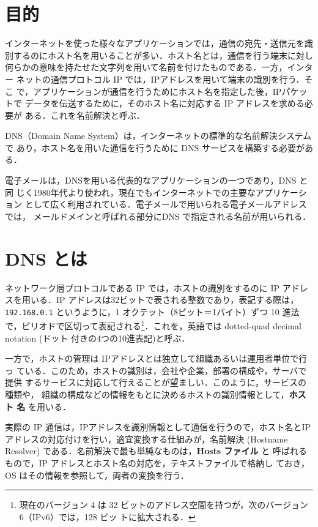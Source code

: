 \section{目的}

インターネットを使った様々なアプリケーションでは，通信の宛先・送信元を識
別するのにホスト名を用いることが多い．ホスト名とは，通信を行う端末に対し
何らかの意味を持たせた文字列を用いて名前を付けたものである．一方，インター
ネットの通信プロトコル IP では，IPアドレスを用いて端末の識別を行う．そこ
で，アプリケーションが通信を行うためにホスト名を指定した後，IPパケットで
データを伝送するために，そのホスト名に対応する IP アドレスを求める必要が
ある．これを名前解決と呼ぶ．

DNS（Domain Name System）は，インターネットの標準的な名前解決システムで
あり，ホスト名を用いた通信を行うために DNS サービスを構築する必要がある．

電子メールは，DNSを用いる代表的なアプリケーションの一つであり，DNS と同
じく1980年代より使われ，現在でもインターネットでの主要なアプリケーション
として広く利用されている．電子メールで用いられる電子メールアドレスでは，
メールドメインと呼ばれる部分にDNS で指定される名前が用いられる．

\section{DNS とは}
ネットワーク層プロトコルである IP では，ホストの識別をするのに IP アドレ
スを用いる．IP アドレスは32ビットで表される整数であり，表記する際は，
\texttt{192.168.0.1} というように，1 オクテット（8ビット＝1バイト）ずつ 
10 進法で，ピリオドで区切って表記される\footnote{現在のバージョン 4 は 
32 ビットのアドレス空間を持つが，次のバージョン 6（IPv6）では，128 ビッ
トに拡大される．}．これを，英語では dotted-quad decimal notation (ドット
付きの4つの10進表記)と呼ぶ．

一方で，ホストの管理は IPアドレスとは独立して組織あるいは運用者単位で行っ
ている．このため，ホストの識別は，会社や企業，部署の構成や，サーバで提供
するサービスに対応して行えることが望ましい．このように，サービスの種類や，
組織の構成などの情報をもとに決めるホストの識別情報として，\textbf{ホスト
名} を用いる．

実際の IP 通信は，IPアドレスを識別情報として通信を行うので，ホスト名とIP 
アドレスの対応付けを行い，適宜変換する仕組みが，名前解決 (Hostname
Resolver) である．名前解決で最も単純なものは，\textbf{Hosts ファイル} と
呼ばれるもので，IP アドレスとホスト名の対応を，テキストファイルで格納し
ておき，OS はその情報を参照して，両者の変換を行う．

